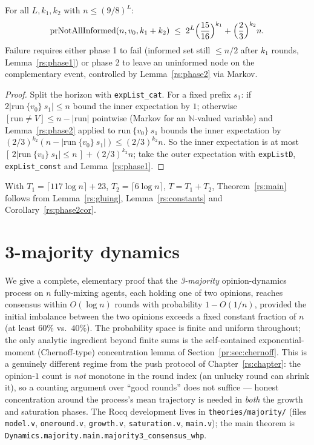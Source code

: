 \begin{lemma}\label{rs:gluing}
  \rocqok
  For all $L, k_1, k_2$ with $n \le (9/8)^L$:
  \[
    \mathrm{prNotAllInformed}(n,v_0,k_1+k_2) \;\le\;
      2^{L}\Bigl(\frac{15}{16}\Bigr)^{k_1} + \Bigl(\frac23\Bigr)^{k_2} n.
  \]
  Failure requires either phase 1 to fail (informed set still $\le n/2$
  after $k_1$ rounds, Lemma~\ref{rs:phase1}) or phase 2 to leave an
  uninformed node on the complementary event, controlled by
  Lemma~\ref{rs:phase2} via Markov.
\end{lemma}
\begin{proof}
  \rocqok
  Split the horizon with \texttt{expList\_cat}. For a fixed prefix $s_1$:
  if $2|\mathrm{run}\ \{v_0\}\ s_1| \le n$ bound the inner expectation by
  $1$; otherwise $[\mathrm{run} \ne V] \le n - |\mathrm{run}|$ pointwise
  (Markov for an $\mathbb{N}$-valued variable) and Lemma~\ref{rs:phase2}
  applied to $\mathrm{run}\ \{v_0\}\ s_1$ bounds the inner expectation by
  $(2/3)^{k_2}(n - |\mathrm{run}\ \{v_0\}\ s_1|) \le (2/3)^{k_2} n$. So the
  inner expectation is at most
  $[\,2|\mathrm{run}\ \{v_0\}\ s_1| \le n\,] + (2/3)^{k_2} n$; take the outer
  expectation with \texttt{expListD}, \texttt{expList\_const} and
  Lemma~\ref{rs:phase1}.
\end{proof}

With $T_1 = \lceil 117\log n \rceil + 23$, $T_2 = \lceil 6\log n \rceil$,
$T = T_1+T_2$, Theorem~\ref{rs:main} follows from Lemma~\ref{rs:gluing},
Lemma~\ref{rs:constants} and Corollary~\ref{rs:phase2cor}.

\chapter{3-majority dynamics}\label{mj:chapter}

We give a complete, elementary proof that the \emph{3-majority}
opinion-dynamics process on $n$ fully-mixing agents, each holding one of two
opinions, reaches consensus within $O(\log n)$ rounds with probability
$1-O(1/n)$, provided the initial imbalance between the two opinions exceeds
a fixed constant fraction of $n$ (at least $60\%$ vs.\ $40\%$). The
probability space is finite and uniform throughout; the only analytic
ingredient beyond finite sums is the self-contained exponential-moment
(Chernoff-type) concentration lemma of Section~\ref{pr:sec:chernoff}. This
is a genuinely different regime from the push protocol of
Chapter~\ref{rs:chapter}: the opinion-$1$ count is \emph{not} monotone in
the round index (an unlucky round can shrink it), so a counting argument
over ``good rounds'' does not suffice --- honest concentration around the
process's mean trajectory is needed in \emph{both} the growth and saturation
phases. The Rocq development lives in \texttt{theories/majority/} (files
\texttt{model.v}, \texttt{oneround.v}, \texttt{growth.v},
\texttt{saturation.v}, \texttt{main.v}); the main theorem is
\texttt{Dynamics.majority.main.majority3\_consensus\_whp}.

